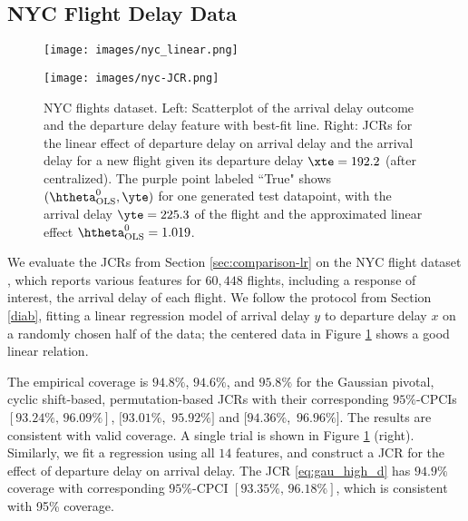\documentclass[english]{article}
\begin{document}
\subsection{NYC Flight Delay Data}\label{nyc}
\begin{figure}[ht]
  \begin{minipage}{0.45\linewidth}
    \centering
    \texttt{[image: images/nyc\_linear.png]}
  \end{minipage}
  \qquad
  \begin{minipage}{0.45\linewidth}
  \centering
    \texttt{[image: images/nyc-JCR.png]}
\label{fig:nyc-JCR} 
  \end{minipage}
  \caption{NYC flights dataset.
  Left:
  Scatterplot of the arrival delay outcome and the departure delay feature with best-fit line.
  Right:
  JCRs for the linear effect of departure delay on arrival delay and the arrival delay for a new flight given its departure delay $\xte = 192.2$ (after centralized). The purple point labeled ``True"
  shows $(\htheta_{\mathrm{OLS}}^0, \yte)$ for one generated test datapoint,
  with the arrival delay $\yte = 225.3$ of the flight and the approximated linear effect $\htheta_{\mathrm{OLS}}^0 = 1.019$.}
  \label{fig:nyc}
\end{figure}
We evaluate the JCRs from Section \ref{sec:comparison-lr} on the NYC flight dataset \citep{wickham2018nycflights13}, 
which reports various features for $60,448$ flights, including a response of interest, the arrival delay of each flight. 
We follow the protocol from Section \ref{diab}, 
fitting a linear regression model
of arrival delay $y$ to departure delay $x$ on a randomly chosen half of the data; the centered data in Figure \ref{fig:nyc} shows a good linear relation. 


The empirical coverage is $94.8\%$, $94.6\%$, and $95.8\%$ for the Gaussian pivotal, cyclic shift-based, permutation-based JCRs with their corresponding $95\%$-CPCIs $[93.24\%,\,96.09\%]$, $[93.01\%$, $\,95.92\%]$ and $[94.36\%$, $\,96.96\%]$.
The results are consistent with valid coverage. A single trial is shown in Figure \ref{fig:nyc} (right).
Similarly, we fit a regression using all $14$ features, and construct a JCR for the effect of departure delay on arrival delay. 
The JCR \eqref{eq:gau_high_d}
has $94.9\%$ coverage with corresponding $95\%$-CPCI $[93.35\%,\,96.18\%]$, which is consistent with 95\% coverage.
\end{document}
